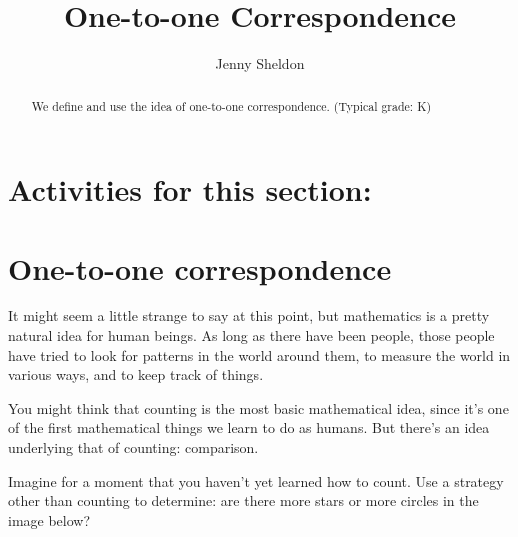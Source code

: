 \documentclass{ximera}
\title{One-to-one Correspondence}
\author{Jenny Sheldon}
\begin{document}
\begin{abstract}
We define and use the idea of one-to-one correspondence. (Typical grade: K)
\end{abstract}
\maketitle

\section{Activities for this section:} 


\section{One-to-one correspondence}


It might seem a little strange to say at this point, but mathematics is a pretty natural idea for 
human beings. As long as there have been people, those people have tried to look for patterns in the world 
around them, to measure the world in various ways, and to keep track of things.

You might think that counting is the most basic mathematical idea, since it's one of the first mathematical 
things we learn to do as humans. But there's an idea underlying that of counting: comparison.

\begin{question}
Imagine for a moment that you haven't yet learned how to count. Use a strategy other than counting to determine: are there  more stars or more circles in the image below?

\begin{image}
\end{image}

\begin{multipleChoice}
\end{multipleChoice}
\end{question}
\end{document}

